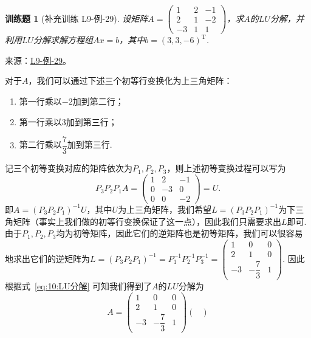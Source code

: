 \documentclass[UTF8,12pt,a4paper,fontset=fandol]{ctexart}
\newtheorem{exercise}{训练题}[section]
\begin{document}
\begin{exercise}[补充训练 L9-例-29]\label{prob:L9-例-29}
设矩阵$A=\begin{pmatrix}
            1 & 2 & -1 \\ 2 & 1 & -2 \\ -3 & 1 & 1
        \end{pmatrix}$，求$A$的$LU$分解，并利用$LU$分解求解方程组$Ax=b$，其中$b=(3,3,-6)^\mathrm{T}$.
\end{exercise}
\noindent 来源：\href{https://github.com/yhwu-is/Linear-Algebra-Left-Undone/blob/new/%E8%AE%B2%E4%B9%89/%E4%B8%93%E9%A2%98/9%20%E7%9F%A9%E9%98%B5%E8%BF%90%E7%AE%97%E8%BF%9B%E9%98%B6.tex}{L9-例-29}。
\begin{solve}
对于$A$，我们可以通过下述三个初等行变换化为上三角矩阵：
    \begin{enumerate}
        \item 第一行乘以$-2$加到第二行；
        \item 第一行乘以$3$加到第三行；
        \item 第二行乘以$\dfrac{7}{3}$加到第三行.
    \end{enumerate}
    记三个初等变换对应的矩阵依次为$P_1,P_2,P_3$，则上述初等变换过程可以写为
    \begin{equation}\label{eq:10:LU分解}
        P_3P_2P_1A=\begin{pmatrix}
            1 & 2 & -1 \\ 0 & -3 & 0 \\ 0 & 0 & -2
        \end{pmatrix}=U.
    \end{equation}
    即$A=(P_3P_2P_1)^{-1}U$，其中$U$为上三角矩阵，我们希望$L=(P_3P_2P_1)^{-1}$为下三角矩阵（事实上我们做的初等行变换保证了这一点），因此我们只需要求出$L$即可. 由于$P_1,P_2,P_3$均为初等矩阵，因此它们的逆矩阵也是初等矩阵，我们可以很容易地求出它们的逆矩阵为$L=(P_3P_2P_1)^{-1}=P_1^{-1}P_2^{-1}P_3^{-1}=\begin{pmatrix}
            1 & 0 & 0 \\ 2 & 1 & 0 \\ -3 & -\dfrac{7}{3} & 1
        \end{pmatrix}$. 因此根据式~\eqref{eq:10:LU分解} 可知我们得到了$A$的$LU$分解为
    \[A=\begin{pmatrix}
            1 & 0 & 0 \\ 2 & 1 & 0 \\ -3 & -\dfrac{7}{3} & 1
        \end{pmatrix}\begin{pmatrix}

\end{pmatrix}\]
\end{solve}
\end{document}
